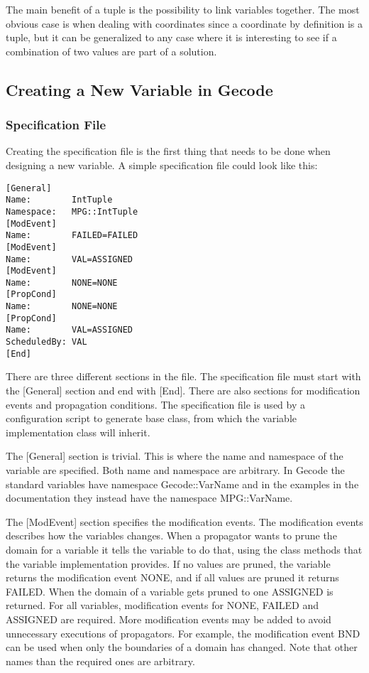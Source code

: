 \documentclass[a4paper,11pt]{article}
\begin{document}
The main benefit of a tuple is the possibility to link variables together. The most obvious case is when dealing with coordinates since a coordinate by definition is a tuple, but it can be generalized to any case where it is interesting to see if a combination of two values are part of a solution.

\newpage

\subsection{Creating a New Variable in Gecode}
\subsubsection{Specification File}
Creating the specification file is the first thing that needs to be done when designing a new variable.  A simple specification file could look like this:

\begin{lstlisting}[frame=single]
[General]
Name:        IntTuple
Namespace:   MPG::IntTuple
[ModEvent]
Name:        FAILED=FAILED
[ModEvent]
Name:        VAL=ASSIGNED
[ModEvent]
Name:        NONE=NONE
[PropCond]
Name:        NONE=NONE
[PropCond]
Name:        VAL=ASSIGNED
ScheduledBy: VAL
[End]
\end{lstlisting}
There are three different sections in the file. The specification file must start with the [General] section and end with [End]. There are also sections for modification events and propagation conditions. The specification file is used by a configuration script to generate base class, from which the variable implementation class will inherit.

The [General] section is trivial. This is where the name and namespace of the variable are specified. Both name and namespace are arbitrary. In Gecode the standard variables have namespace Gecode::VarName and in the examples in the documentation they instead have the namespace MPG::VarName.

The [ModEvent] section specifies the modification events. The modification events describes how the variables changes. When a propagator wants to prune the domain for a variable it tells the variable to do that, using the class methods that the variable implementation provides. If no values are pruned, the variable returns the modification event NONE, and if all values are pruned it returns FAILED. When the domain of a variable gets pruned to one ASSIGNED is returned. For all variables, modification events for NONE, FAILED and ASSIGNED are required. More modification events may be added to avoid unnecessary executions of propagators. For example, the modification event BND can be used when only the boundaries of a domain has changed. Note that other names than the required ones are arbitrary.
\end{document}
